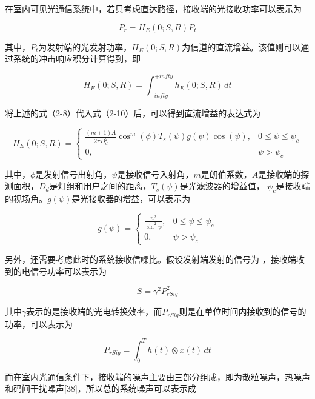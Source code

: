 在室内可见光通信系统中，若只考虑直达路径，接收端的光接收功率可以表示为

\begin{equation}
    P_{r}=H_{E}(0;S,R)P_{t}
\end{equation}

其中，$P_{t}$为发射端的光发射功率，$H_{E}(0;S,R)$为信道的直流增益。该值则可以通过系统的冲击响应积分计算得到，即

\begin{equation}
    H_{E}(0;S,R)=\int_{-infty}^{+infty} h_{E}(0;S,R)\, dt
\end{equation}

将上述的式（2-8）代入式（2-10）后，可以得到直流增益的表达式为

\begin{equation}
    H_{E}(0;S,R)=
    \begin{cases}
        \frac{(m+1)A}{2\pi D_{d}^2}\cos^m(\phi)T_{s}(\psi)g(\psi)\cos(\psi),  & 0\le\psi\le\psi_{c} \\
        0,  & \psi>\psi_{c}
    \end{cases}
\end{equation}

其中，$\phi$是发射信号出射角，$\psi$是接收信号入射角，$m$是朗伯系数，$A$是接收端的探测面积，$D_{d}$是灯组和用户之间的距离，$T_{s}(\psi)$是光滤波器的增益值， $\psi_{c}$是接收端的视场角。$g(\psi)$是光接收器的增益，可以表示为

\begin{equation}
    g(\psi)=
    \begin{cases}
        \frac{n^2}{\sin^2\psi},  & 0\le\psi\le\psi_{c} \\
        0,  & \psi>\psi_{c}
    \end{cases}
\end{equation}

另外，还需要考虑此时的系统接收信噪比。假设发射端发射的信号为 ，接收端收到的电信号功率可以表示为

\begin{equation}
    S=\gamma^2P_{rSig}^2
\end{equation}

其中$\gamma$表示的是接收端的光电转换效率，而$P_{rSig}$则是在单位时间内接收到的信号的功率，可以表示为

\begin{equation}
    P_{rSig}=\int_{0}^{T} h(t) \otimes x(t)\, dt
\end{equation}

而在室内光通信条件下，接收端的噪声主要由三部分组成，即为散粒噪声，热噪声和码间干扰噪声[38]，所以总的系统噪声可以表示成

